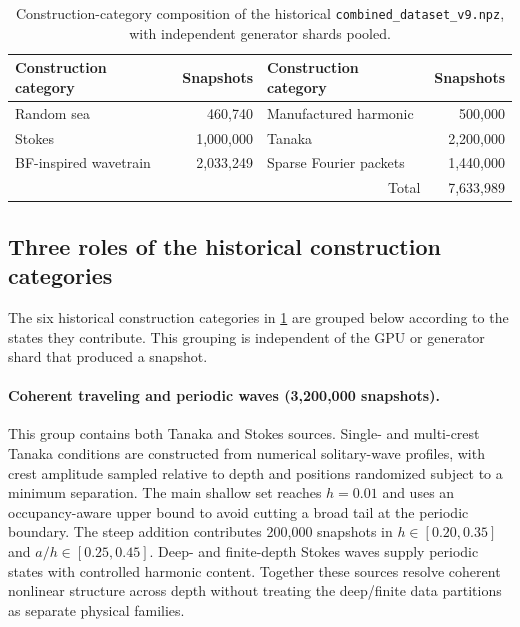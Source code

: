 \begin{table}[t]
  \centering
  \caption{Construction-category composition of the historical
  \texttt{combined\_dataset\_v9.npz}, with independent generator shards pooled.}
  \label{tab:data-composition}
  \begin{tabular}{lr@{\qquad}lr}
    \toprule
    Construction category & Snapshots & Construction category & Snapshots\\
    \midrule
    Random sea       & 460,740   & Manufactured harmonic & 500,000\\
    Stokes           & 1,000,000 & Tanaka          & 2,200,000\\
    BF-inspired wavetrain & 2,033,249 & Sparse Fourier packets & 1,440,000\\
    \midrule
    \multicolumn{3}{r}{Total} & 7,633,989\\
    \bottomrule
  \end{tabular}
\end{table}

\subsection{Three roles of the historical construction categories}

The six historical construction categories in \cref{tab:data-composition}
are grouped below according to the states they contribute.  This grouping is
independent of the GPU or generator shard that produced a snapshot.

\paragraph{Coherent traveling and periodic waves (3,200,000 snapshots).}
This group contains both Tanaka and Stokes sources.  Single- and multi-crest
Tanaka conditions are constructed from numerical solitary-wave profiles, with
crest amplitude sampled relative to depth and positions randomized subject to
a minimum separation.  The main shallow set reaches $h=0.01$ and uses an
occupancy-aware upper bound to avoid cutting a broad tail at the periodic
boundary.  The steep addition contributes 200,000 snapshots in
$h\in[0.20,0.35]$ and $a/h\in[0.25,0.45]$.  Deep- and finite-depth Stokes waves
supply periodic states with controlled harmonic content.  Together these
sources resolve coherent nonlinear structure across depth without treating
the deep/finite data partitions as separate physical families.

